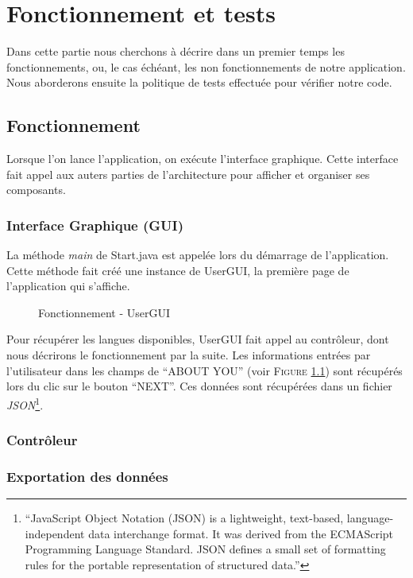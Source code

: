 \chapter{Fonctionnement et tests}

Dans cette partie nous cherchons à décrire dans un premier temps les fonctionnements, ou, le cas échéant, les non fonctionnements de notre application.  Nous aborderons ensuite la politique de tests effectuée pour vérifier notre code. 

\section{Fonctionnement}

Lorsque l'on lance l'application, on exécute l'interface graphique. Cette interface fait appel aux auters parties de l'architecture pour afficher et organiser ses composants.

\subsection{Interface Graphique (GUI)}

La méthode \textit{main} de Start.java est appelée lors du démarrage de l'application. Cette méthode fait créé une instance de UserGUI, la première page de l'application qui s'affiche.

\begin{figure}[!ht]
\begin{center}
  \caption{Fonctionnement - UserGUI}
  \label{UserGUI} 
\end{center}
\end{figure}

Pour récupérer les langues disponibles, UserGUI fait appel au contrôleur, dont nous décrirons le fonctionnement par la suite.
Les informations entrées par l'utilisateur dans les champs de ``ABOUT YOU'' (voir \textsc{Figure} \ref{UserGUI}) sont récupérés lors du clic sur le bouton ``NEXT''. Ces données sont récupérées dans un fichier \textit{JSON}\footnote{``JavaScript Object Notation (JSON) is a lightweight, text-based, language-independent data interchange format. It was derived from the ECMAScript Programming Language Standard.  JSON defines a small set of formatting rules for the portable representation of structured data.''\cite{bray2014javascript}}.

\subsection{Contrôleur}
\lipsum[7]


\subsection{Exportation des données}
\lipsum[8]
